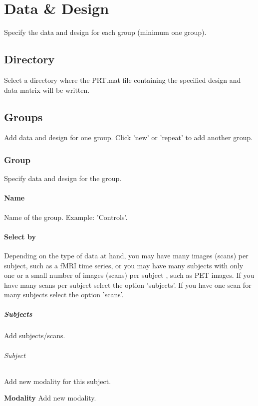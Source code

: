 
\chapter{Data \& Design  \label{Chap:data}}

\vskip 1.5cm

Specify the data and design for each group (minimum one group).


\section{Directory}
Select a directory where the PRT.mat file containing the specified design and data matrix will be written.


\section{Groups}
Add data and design for one group. Click 'new' or 'repeat' to add another group.


\subsection{Group}
Specify data and design for the group.


\subsubsection{Name}
Name of the group. Example: 'Controls'.


\subsubsection{Select by}
Depending on the type of data at hand, you may have many images (scans) per subject, such as a fMRI time series, or you may have many subjects with only one or a small number of images (scans) per subject , such as PET images. If you have many scans per subject select the option 'subjects'. If you have one scan for many subjects select the option 'scans'.


\paragraph{Subjects}
Add subjects/scans.


\subparagraph{Subject}
Add new modality for this subject.


\textbf{Modality}
Add new modality.


